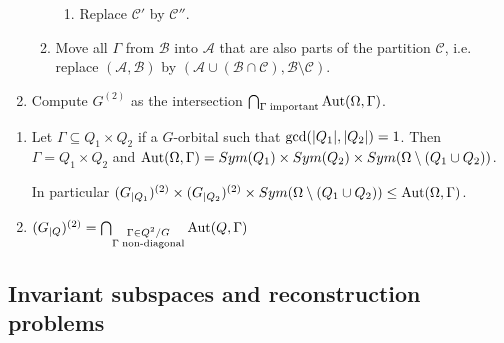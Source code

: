 \documentclass[fontsize=11pt,fleqn,a4paper]{scrartcl}
\begin{document}
\begin{algorithm}
\begin{enumerate}[label=\arabic*.)]
\begin{enumerate}[label=\roman*.)]
\begin{enumerate}[label=\alph*.)]
	\item Replace $\mathcal{C}'$ by $\mathcal{C}''$.
	\end{enumerate}

\item Move all $\Gamma$ from $\mathcal{B}$ into $\mathcal{A}$ that are also parts of the partition $\mathcal{C}$, i.e. replace $(\mathcal{A},\mathcal{B})$ by $(\mathcal{A} \cup (\mathcal{B}\cap\mathcal{C}), \mathcal{B}\setminus\mathcal{C})$.
\end{enumerate}

\item Compute $G^{(2)}$ as the intersection $\bigcap_{\Gamma\;\text{important}} \operatorname{Aut}(\Omega,\Gamma)$.
\end{enumerate}
\end{algorithm}

\begin{lemma}
\begin{enumerate}
\item Let $\Gamma\subseteq Q_1\times Q_2$ if a $G$-orbital such that $\operatorname{gcd}(\lvert Q_1\rvert,\lvert Q_2\rvert)=1$. Then $\Gamma=Q_1\times Q_2$ and $\operatorname{Aut}(\Omega,\Gamma) = Sym(Q_1)\times Sym(Q_2) \times Sym(\Omega\setminus(Q_1\cup Q_2))$.

In particular $(G_{|Q_1})^{(2)} \times (G_{|Q_2})^{(2)} \times Sym(\Omega\setminus(Q_1\cup Q_2)) \leq \operatorname{Aut}(\Omega,\Gamma)$.

\item $(G_{|Q})^{(2)} = \bigcap_{\substack{\Gamma\in Q^2/G \\ \Gamma \;\text{non-diagonal}}} \operatorname{Aut}(Q,\Gamma)$
\end{enumerate}
\end{lemma}

\begin{algorithm}

\end{algorithm}

\subsection{Invariant subspaces and reconstruction problems}
\end{document}
